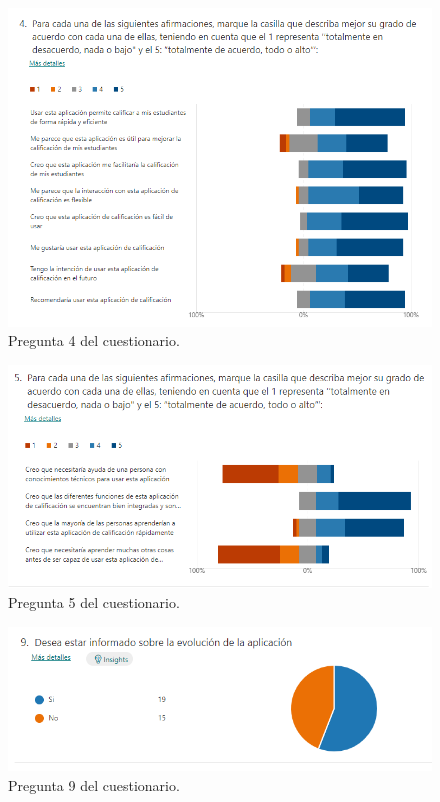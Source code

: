 \begin{figure}[h]
\centering\includegraphics[width=1\linewidth]{figs/pregunta4.png}
\caption{Pregunta 4 del cuestionario.}
\label{Fig:pregunta4}
\end{figure}

\begin{figure}[h]
\centering\includegraphics[width=1\linewidth]{figs/pregunta5.png}
\caption{Pregunta 5 del cuestionario.}
\label{Fig:pregunta5}
\end{figure}

\begin{figure}[h]
\centering\includegraphics[width=1\linewidth]{figs/pregunta9.png}
\caption{Pregunta 9 del cuestionario.}
\label{Fig:pregunta9}
\end{figure}

